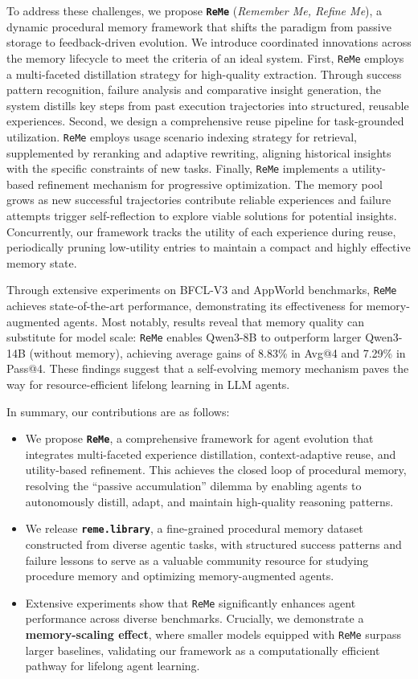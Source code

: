 \documentclass[11pt]{article}
\newcommand{\ours}{\texttt{ReMe}}
\begin{document}
To address these challenges, we propose \textbf{\ours} (\textit{Remember Me, Refine Me}), a dynamic procedural memory framework that shifts the paradigm from passive storage to feedback-driven evolution. 
We introduce coordinated innovations across the memory lifecycle to meet the criteria of an ideal system.
First, {\ours} employs a multi-faceted distillation strategy for high-quality extraction. Through success pattern recognition, failure analysis and comparative insight generation, the system distills key steps from past execution trajectories into structured, reusable experiences. 
Second, we design a comprehensive reuse pipeline for task-grounded utilization. {\ours} employs usage scenario indexing strategy for retrieval, supplemented by reranking and adaptive rewriting, aligning historical insights with the specific constraints of new tasks. 
Finally, {\ours} implements a utility-based refinement mechanism for progressive optimization. %
The memory pool grows as new successful trajectories contribute reliable experiences and failure attempts trigger self-reflection to explore viable solutions for potential insights. 
Concurrently, our framework tracks the utility of each experience during reuse, periodically pruning low-utility entries to maintain a compact and highly effective memory state. 


Through extensive experiments on BFCL-V3 and AppWorld benchmarks, {\ours} achieves state-of-the-art performance, demonstrating its effectiveness for memory-augmented agents. 
Most notably, results reveal that memory quality can substitute for model scale: {\ours} enables Qwen3-8B to outperform larger Qwen3-14B (without memory), achieving average gains of 8.83\% in Avg@4 and 7.29\% in Pass@4. 
These findings suggest that a self-evolving memory mechanism paves the way for resource-efficient lifelong learning in LLM agents.

In summary, our contributions are as follows:
\begin{itemize}[leftmargin=12pt,topsep=2pt,itemsep=2pt]
    \item We propose \textbf{\ours}, a comprehensive framework for agent evolution that integrates multi-faceted experience distillation, context-adaptive reuse, and utility-based refinement. This achieves the closed loop of procedural memory, resolving the ``passive accumulation'' dilemma by enabling agents to autonomously distill, adapt, and maintain high-quality reasoning patterns.
    \item We release \textbf{\texttt{reme.library}}, a fine-grained procedural memory dataset constructed from diverse agentic tasks, with structured success patterns and failure lessons to serve as a valuable community resource for studying procedure memory and optimizing memory-augmented agents.
    \item Extensive experiments show that {\ours} significantly enhances agent performance across diverse benchmarks. Crucially, we demonstrate a \textbf{memory-scaling effect}, where smaller models equipped with {\ours} surpass larger baselines, validating our framework as a computationally efficient pathway for lifelong agent learning.
\end{itemize}
\end{document}
